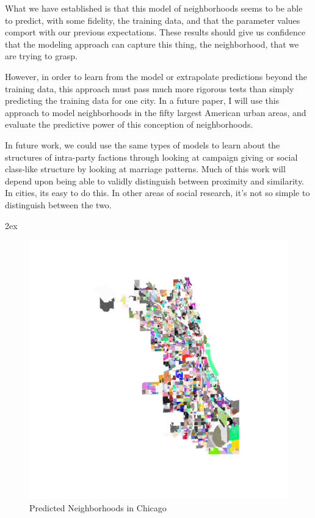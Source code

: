 \documentclass[12pt,letter]{article}\usepackage[]{graphicx}\usepackage[]{color}
\begin{document}
What we have established is that this model of neighborhoods seems to
be able to predict, with some fidelity, the training data, and that
the parameter values comport with our previous expectations. These
results should give us confidence that the modeling approach can
capture this thing, the neighborhood, that we are trying to grasp.

However, in order to learn from the model or extrapolate 
predictions beyond the training data, this approach must pass much
more rigorous tests than simply predicting the training data for one
city. In a future paper, I will use this approach to model
neighborhoods in the fifty largest American urban areas, and evaluate
the predictive power of this conception of neighborhoods. 

In future work, we could use the same types of models to learn about
the structures of intra-party factions through looking at campaign
giving or social class-like structure by looking at marriage
patterns. Much of this work will depend upon being able to validly
distinguish between proximity and similarity. In cities, its easy to
do this. In other areas of social research, it's not so simple to
distinguish between the two.

\newpage
\begingroup
\parindent 0pt
\parskip 2ex
\def\enotesize{\normalsize}
\theendnotes
\endgroup

\newpage



\begin{figure}
\includegraphics{../code/training/predicted_chicago_neighborhoods.pdf}
\caption{Predicted Neighborhoods in Chicago}
\end{figure}
\end{document}
